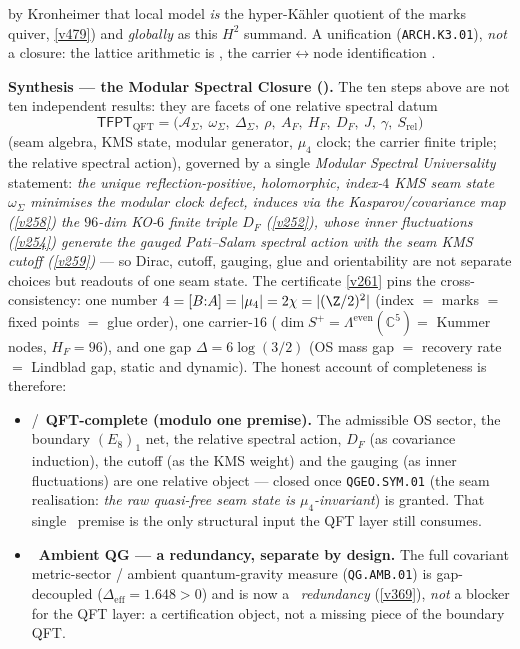 by Kronheimer that local model \emph{is} the hyper-K\"ahler quotient of the marks quiver, \vref{v479})
and \emph{globally} as this $H^2$ summand. A unification (\texttt{ARCH.K3.01}), \emph{not} a closure: the
lattice arithmetic is \mE, the carrier$\leftrightarrow$node identification \mC.
\par\smallskip\noindent\textbf{Synthesis --- the Modular Spectral Closure ().}
The ten steps above are not ten independent results: they are facets of one relative spectral datum
\[
  \boxed{\ \mathsf{TFPT}_{\mathrm{QFT}}=\bigl(\mathcal A_\Sigma,\ \omega_\Sigma,\ \Delta_\Sigma,\ \rho,\
  A_F,\ H_F,\ D_F,\ J,\ \gamma,\ S_{\mathrm{rel}}\bigr)\ }
\]
(seam algebra, KMS state, modular generator, $\mu_4$ clock; the carrier finite triple; the relative
spectral action), governed by a single \emph{Modular Spectral Universality} statement: \emph{the unique
reflection-positive, holomorphic, index-$4$ KMS seam state $\omega_\Sigma$ minimises the modular clock
defect, induces via the Kasparov/covariance map (\vref{v258}) the $96$-dim KO-$6$ finite triple $D_F$
(\vref{v252}), whose inner fluctuations (\vref{v254}) generate the gauged Pati--Salam spectral action with
the seam KMS cutoff (\vref{v259})} --- so Dirac, cutoff, gauging, glue and orientability are not separate
choices but readouts of one seam state. The certificate \vref{v261} pins the cross-consistency: one number
$4=[B{:}A]=|\mu_4|=2\chi=|(\Z/2)^2|$ (index $=$ marks $=$ fixed points $=$ glue order), one carrier-$16$
($\dim S^+=\Lambda^{\mathrm{even}}(\mathbb C^5)=$ Kummer nodes, $H_F=96$), and one gap
$\Delta=6\log(3/2)$ (OS mass gap $=$ recovery rate $=$ Lindblad gap, static and dynamic). The honest
account of completeness is therefore:
\begin{itemize}\setlength\itemsep{1pt}
\item \mE/\mC\ \textbf{QFT-complete (modulo one premise).} The admissible OS sector, the boundary
  $(E_8)_1$ net, the relative spectral action, $D_F$ (as covariance induction), the cutoff (as the KMS
  weight) and the gauging (as inner fluctuations) are one relative object --- closed once
  \texttt{QGEO.SYM.01} (the seam realisation: \emph{the raw quasi-free seam state is $\mu_4$-invariant}) is
  granted. That single \mO\ premise is the only structural input the QFT layer still consumes.
\item \mC\ \textbf{Ambient QG --- a redundancy, separate by design.} The full covariant metric-sector / ambient
  quantum-gravity measure (\texttt{QG.AMB.01}) is gap-decoupled ($\Delta_{\mathrm{eff}}=1.648>0$) and is now a
  \mC\ \emph{redundancy} (\vref{v369}), \emph{not} a blocker for the QFT layer: a certification object, not a
  missing piece of the boundary QFT.
\end{itemize}
